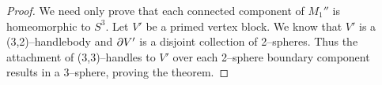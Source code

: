 \begin{proof}
	We need only prove that each connected component of $M_1''$ is homeomorphic to $S^3$.
	Let $V'$ be a primed vertex block.
	We know that $V'$ is a (3,2)--handlebody and $\partial V'$ is a disjoint collection of 2--spheres.
	Thus the attachment of (3,3)--handles to $V'$ over each 2--sphere boundary component results in a 3--sphere, proving the theorem.
	
	 

%
%
%
%	
%	
%	
\end{proof}

